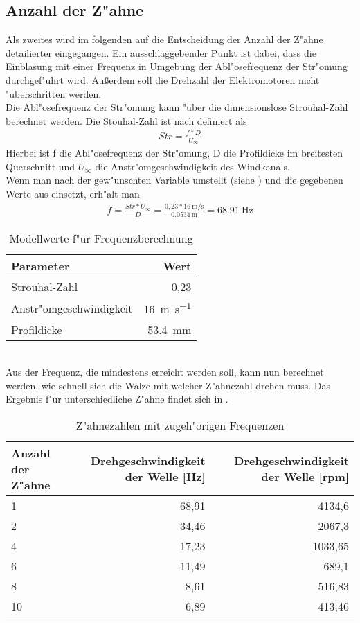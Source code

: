 \subsection{Anzahl der Z"ahne}
Als zweites wird im folgenden auf die Entscheidung der Anzahl der Z"ahne detailierter eingegangen. Ein ausschlaggebender Punkt ist dabei, dass die Einblasung mit einer Frequenz in Umgebung der Abl"osefrequenz der Str"omung durchgef"uhrt wird. Au\ss{}erdem soll die Drehzahl der Elektromotoren nicht "uberschritten werden.\\
Die Abl"osefrequenz der Str"omung kann "uber die dimensionslose Strouhal-Zahl berechnet werden. Die Stouhal-Zahl ist nach \cite{Leder.1992} definiert als
\begin{align}
	{Str}=\frac{f*D}{U_{\infty}}	\label{eq:Str}
\end{align}
Hierbei ist f die Abl"osefrequenz der Str"omung, D die Profildicke im breitesten Querschnitt und $U_{\infty}$ die Anstr"omgeschwindigkeit des Windkanals.\\
Wenn man  nach der gew"unschten Variable umstellt (siehe ) und die gegebenen Werte aus  einsetzt, erh"alt man
\begin{align}
	{f}=\frac{Str*U_{\infty}}{D}
		=\frac{0,23*\SI{16}{\meter\per\second}}{\SI{0,0534}{\meter}}
		=\SI{68,91}{\hertz}
		\label{eq:nachfumgestellt}
\end{align}
\begin{table}[h!]
	\centering
	\begin{tabular}{lr}
		\toprule
		Parameter & Wert\\
		\midrule
		Strouhal-Zahl & 0,23\\
		Anstr"omgeschwindigkeit & \SI{16}{\meter\per\second}\\
		Profildicke & \SI{53,4}{\milli\meter}\\
		\bottomrule
	\end{tabular}
	\caption{Modellwerte f"ur Frequenzberechnung}
	\label{tab:Modellwerte}
\end{table}\\
Aus der Frequenz, die mindestens erreicht werden soll, kann nun berechnet werden, wie schnell sich die Walze mit welcher Z"ahnezahl drehen muss. Das Ergebnis f"ur unterschiedliche Z"ahne findet sich in .\\
\begin{table}[h]
	\centering
	\begin{tabular}{lrr}
		\toprule
		Anzahl der Z"ahne & Drehgeschwindigkeit der Welle [Hz] & Drehgeschwindigkeit der Welle [rpm]\\
		\midrule
		1 & 68,91 & 4134,6\\
		2 & 34,46 & 2067,3\\
		4 & 17,23 & 1033,65\\
		6 & 11,49 & 689,1\\
		8 & 8,61 & 516,83\\
		10 & 6,89 & 413,46\\
		\bottomrule
	\end{tabular}\\
	\caption{Z"ahnezahlen mit zugeh"origen Frequenzen}
	\label{tab:zahnezahl}
\end{table}

